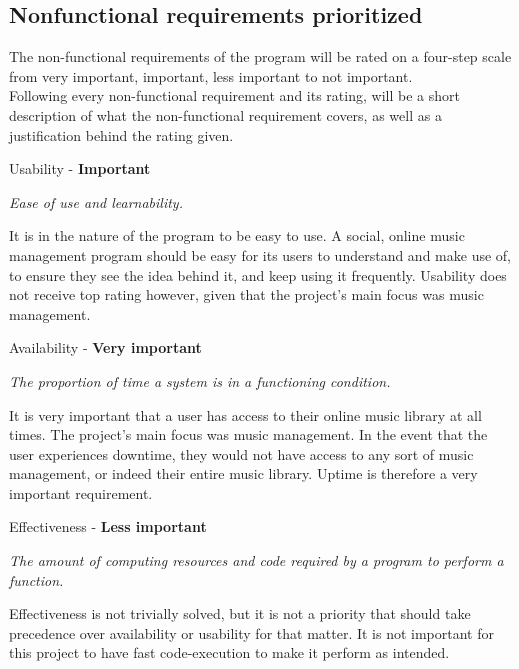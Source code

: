 \subsection{Nonfunctional requirements prioritized}


The non-functional requirements of the program will be rated on a four-step scale from very important, important, less important to not important.
\\
Following every non-functional requirement and its rating, will be a short description of what the non-functional requirement covers, as well as a justification behind the rating given.
\newpage

\noindent
Usability - \textbf{Important}

\vspace{5 mm}
\noindent
\textit{Ease of use and learnability.}

\vspace{5 mm}

\noindent
It is in the nature of the program to be easy to use. A social, online music management program should be easy for its users to understand and make use of, to ensure they see the idea behind it, and keep using it frequently. Usability does not receive top rating however, given that the project's main focus was music management.

\vspace{5 mm}
\noindent
Availability - \textbf{Very important}

\vspace{5 mm}
\noindent
\textit{The proportion of time a system is in a functioning condition.}

\vspace{5 mm}
\noindent
It is very important that a user has access to their online music library at all times. The project's main focus was music management. In the event that the user experiences downtime, they would not have access to any sort of music management, or indeed their entire music library. Uptime is therefore a very important requirement.

\vspace{5 mm}
\noindent
Effectiveness - \textbf{Less important}

\vspace{5 mm}
\noindent
\textit{The amount of computing resources and code required by a program to perform a function.}

\vspace{5 mm}
\noindent
Effectiveness is not trivially solved, but it is not a priority that should take precedence over availability or usability for that matter. It is not important for this project to have fast code-execution to make it perform as intended.

